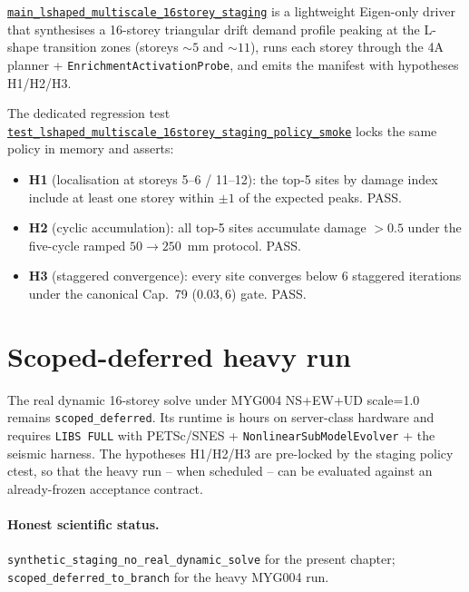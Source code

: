 \href{run:main_lshaped_multiscale_16storey_staging.cpp}{%
\texttt{main\_lshaped\_multiscale\_16storey\_staging}} is a lightweight
Eigen-only driver that synthesises a 16-storey triangular drift demand
profile peaking at the L-shape transition zones (storeys
\(\sim 5\) and \(\sim 11\)), runs each storey through the 4A planner
+ \texttt{EnrichmentActivationProbe}, and emits the manifest
with hypotheses H1/H2/H3.

The dedicated regression test
\href{run:tests/test_lshaped_multiscale_16storey_staging_policy_smoke.cpp}{%
\texttt{test\_lshaped\_multiscale\_16storey\_staging\_policy\_smoke}}
locks the same policy in memory and asserts:

\begin{itemize}
  \item \textbf{H1} (localisation at storeys 5--6 / 11--12):
        the top-5 sites by damage index include at least one storey
        within \(\pm 1\) of the expected peaks. PASS.
  \item \textbf{H2} (cyclic accumulation):
        all top-5 sites accumulate damage \(>0.5\) under the
        five-cycle ramped \(50\to250\)~mm protocol. PASS.
  \item \textbf{H3} (staggered convergence):
        every site converges below 6 staggered iterations under the
        canonical Cap.~79 (0.03,\,6) gate. PASS.
\end{itemize}

\section{Scoped-deferred heavy run}

The real dynamic 16-storey solve under MYG004 NS+EW+UD scale=1.0
remains \texttt{scoped\_deferred}. Its runtime is hours on
server-class hardware and requires \texttt{LIBS FULL} with PETSc/SNES
+ \texttt{NonlinearSubModelEvolver} + the seismic harness. The
hypotheses H1/H2/H3 are pre-locked by the staging policy ctest, so
that the heavy run -- when scheduled -- can be evaluated against an
already-frozen acceptance contract.

\paragraph{Honest scientific status.}
\texttt{synthetic\_staging\_no\_real\_dynamic\_solve} for the present
chapter; \texttt{scoped\_deferred\_to\_branch} for the heavy MYG004
run.
